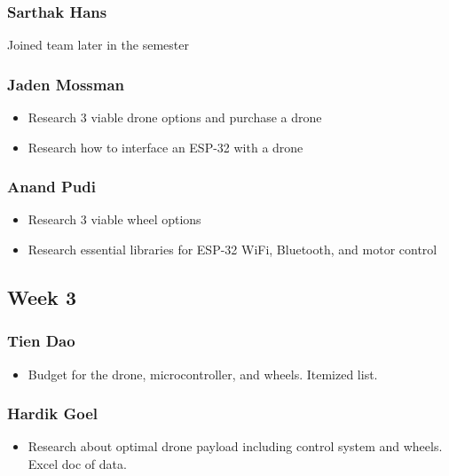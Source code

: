 \documentclass[12pt]{article}
\begin{document}
            \subsubsection*{Sarthak Hans}
                Joined team later in the semester
            \subsubsection*{Jaden Mossman}
                \begin{itemize}
                    \item Research 3 viable drone options and purchase a drone
                    \item Research how to interface an ESP-32 with a drone
                \end{itemize}
            \subsubsection*{Anand Pudi}
                \begin{itemize}
                    \item Research 3 viable wheel options
                    \item Research essential libraries for ESP-32 WiFi, Bluetooth, and motor control
                \end{itemize}
        
        \subsection*{Week 3}
            \subsubsection*{Tien Dao}
                \begin{itemize}
                    \item Budget for the drone, microcontroller, and wheels. Itemized list.
                \end{itemize}
            \subsubsection*{Hardik Goel}
                \begin{itemize}
                    \item Research about optimal drone payload including control system and wheels. Excel doc of data.
                \end{itemize}
\end{document}
